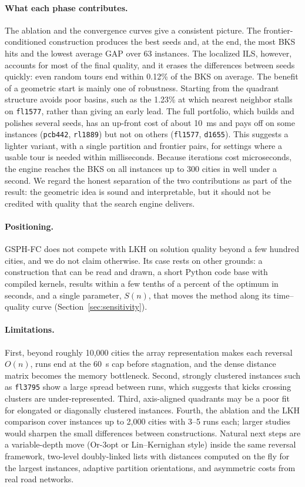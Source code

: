 \documentclass[runningheads]{llncs}
\begin{document}
\paragraph{What each phase contributes.} The ablation and the
convergence curves give a consistent picture. The frontier-conditioned
construction produces the best seeds and, at the end, the most BKS hits
and the lowest average GAP over 63 instances. The localized ILS,
however, accounts for most of the final quality, and it erases the
differences between seeds quickly: even random tours end within 0.12\%
of the BKS on average. The benefit of a geometric start is mainly one of
robustness. Starting from the quadrant structure avoids poor basins,
such as the 1.23\% at which nearest neighbor stalls on \texttt{fl1577},
rather than giving an early lead. The full portfolio, which builds and
polishes several seeds, has an up-front cost of about 10~ms and pays off
on some instances (\texttt{pcb442}, \texttt{rl1889}) but not on others
(\texttt{fl1577}, \texttt{d1655}). This suggests a lighter variant, with
a single partition and frontier pairs, for settings where a usable tour
is needed within milliseconds. Because iterations cost microseconds, the
engine reaches the BKS on all instances up to 300 cities in well under a
second. We regard the honest separation of the two contributions as
part of the result: the geometric idea is sound and interpretable, but
it should not be credited with quality that the search engine delivers.

\paragraph{Positioning.} GSPH-FC does not compete with LKH on solution
quality beyond a few hundred cities, and we do not claim otherwise. Its
case rests on other grounds: a construction that can be read and drawn,
a short Python code base with compiled kernels, results within a few
tenths of a percent of the optimum in seconds, and a single parameter,
$S(n)$, that moves the method along its time--quality curve
(Section~\ref{sec:sensitivity}).

\paragraph{Limitations.} First, beyond roughly 10{,}000 cities the
array representation makes each reversal $O(n)$, runs end at the 60~s
cap before stagnation, and the dense distance matrix becomes the memory
bottleneck. Second, strongly clustered instances such as
\texttt{fl3795} show a large spread between runs, which suggests that
kicks crossing clusters are under-represented. Third, axis-aligned
quadrants may be a poor fit for elongated or diagonally clustered
instances. Fourth, the ablation and the LKH comparison cover instances
up to 2{,}000 cities with 3--5 runs each; larger studies would sharpen
the small differences between constructions. Natural next steps are a
variable-depth move (Or-3opt or Lin--Kernighan style) inside the same
reversal framework, two-level doubly-linked lists with distances
computed on the fly for the largest instances, adaptive partition
orientations, and asymmetric costs from real road networks.
\end{document}
